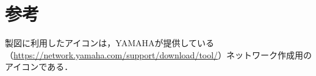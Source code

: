 \chapter{参考}
製図に利用したアイコンは，YAMAHAが提供している（\url{https://network.yamaha.com/support/download/tool/}）ネットワーク作成用のアイコンである．